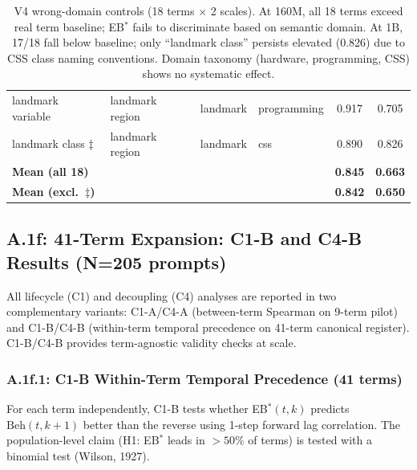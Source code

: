 \documentclass[10pt]{article} %
\begin{document}
\begin{table}[H]
\begin{tabular}{|l|l|l|l|c|c|}
landmark variable & landmark region & landmark & programming & 0.917 & 0.705 \\
landmark class $\ddagger$ & landmark region & landmark & css & 0.890 & 0.826 \\
\hline
\textbf{Mean (all 18)} & & & & \textbf{0.845} & \textbf{0.663} \\
\textbf{Mean (excl.\ $\ddagger$)} & & & & \textbf{0.842} & \textbf{0.650} \\
\hline
\end{tabular}
\caption{V4 wrong-domain controls (18 terms $\times$ 2 scales). At 160M, all 18 terms exceed real term baseline; EB$^*$ fails to discriminate based on semantic domain. At 1B, 17/18 fall below baseline; only ``landmark class'' persists elevated (0.826) due to CSS class naming conventions. Domain taxonomy (hardware, programming, CSS) shows no systematic effect.}
\end{table}

\subsection*{A.1f: 41-Term Expansion: C1-B and C4-B Results (N=205 prompts)}\mbox{}

All lifecycle (C1) and decoupling (C4) analyses are reported in two complementary variants: C1-A/C4-A (between-term Spearman on 9-term pilot) and C1-B/C4-B (within-term temporal precedence on 41-term canonical register). C1-B/C4-B provides term-agnostic validity checks at scale.

\subsubsection*{A.1f.1: C1-B Within-Term Temporal Precedence (41 terms)}

For each term independently, C1-B tests whether EB$^*(t, k)$ predicts $\text{Beh}(t, k+1)$ better than the reverse using 1-step forward lag correlation. The population-level claim (H1: EB$^*$ leads in $>50\%$ of terms) is tested with a binomial test (Wilson, 1927).
\end{document}
